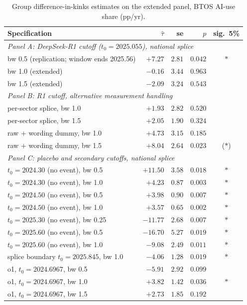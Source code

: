 \documentclass[11pt]{article}
\begin{document}
\begin{table}[t]
\centering
\small
\caption{Group difference-in-kinks estimates on the extended panel, BTOS
AI-use share (pp/yr).}
\label{tab:dik}
\begin{tabular}{lrrrc}
\toprule
Specification & $\hat\tau$ & se & $p$ & sig.\ 5\% \\
\midrule
\multicolumn{5}{l}{\emph{Panel A: DeepSeek-R1 cutoff ($t_0=2025.055$), national splice}}\\
bw 0.5 (replication; window ends 2025.56) & $+7.27$ & $2.81$ & $0.042$ & $\ast$ \\
bw 1.0 (extended)                         & $-0.16$ & $3.44$ & $0.963$ &  \\
bw 1.5 (extended)                         & $-2.09$ & $3.24$ & $0.543$ &  \\
\midrule
\multicolumn{5}{l}{\emph{Panel B: R1 cutoff, alternative measurement handling}}\\
per-sector splice, bw 1.0            & $+1.93$ & $2.82$ & $0.520$ &  \\
per-sector splice, bw 1.5            & $+2.05$ & $1.90$ & $0.324$ &  \\
raw $+$ wording dummy, bw 1.0        & $+4.73$ & $3.15$ & $0.185$ &  \\
raw $+$ wording dummy, bw 1.5        & $+8.04$ & $2.64$ & $0.023$ & ($\ast$) \\
\midrule
\multicolumn{5}{l}{\emph{Panel C: placebo and secondary cutoffs, national splice}}\\
$t_0=2024.30$ (no event), bw 0.5     & $+11.50$ & $3.58$ & $0.018$ & $\ast$ \\
$t_0=2024.30$ (no event), bw 1.0     & $+4.23$ & $0.87$ & $0.003$ & $\ast$ \\
$t_0=2024.50$ (no event), bw 0.5     & $+3.98$ & $0.90$ & $0.007$ & $\ast$ \\
$t_0=2024.50$ (no event), bw 1.0     & $+3.57$ & $0.65$ & $0.002$ & $\ast$ \\
$t_0=2025.30$ (no event), bw 0.25    & $-11.77$ & $2.68$ & $0.007$ & $\ast$ \\
$t_0=2025.60$ (no event), bw 0.5     & $-16.70$ & $5.27$ & $0.019$ & $\ast$ \\
$t_0=2025.60$ (no event), bw 1.0     & $-9.08$ & $2.49$ & $0.011$ & $\ast$ \\
splice boundary $t_0=2025.845$, bw 1.0 & $-4.06$ & $1.28$ & $0.019$ & $\ast$ \\
o1, $t_0=2024.6967$, bw 0.5          & $-5.91$ & $2.92$ & $0.099$ &  \\
o1, $t_0=2024.6967$, bw 1.0          & $+3.82$ & $1.42$ & $0.036$ & $\ast$ \\
o1, $t_0=2024.6967$, bw 1.5          & $+2.73$ & $1.85$ & $0.192$ &  \\
\bottomrule
\end{tabular}


\end{table}
\end{document}
